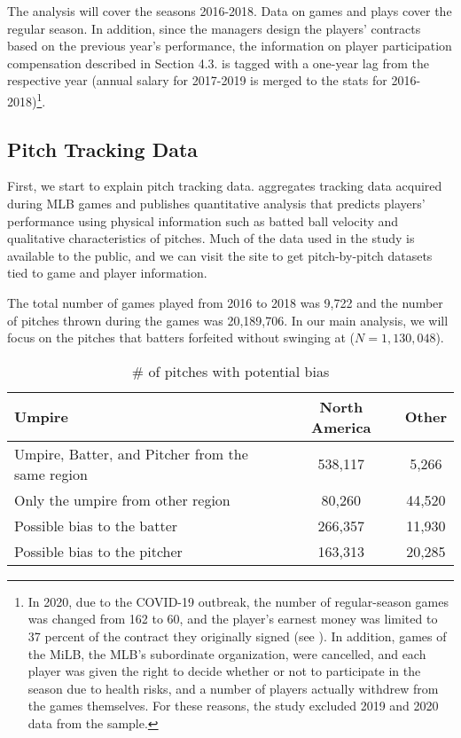 \documentclass[dvipdfmx, 12pt]{jsarticle}
\begin{document}
The analysis will cover the seasons 2016-2018. Data on games and plays cover the regular season. In addition, since the managers design the players' contracts based on the previous year's performance, the information on player participation compensation described in Section 4.3. is tagged with a one-year lag from the respective year (annual salary for 2017-2019 is merged to the stats for 2016-2018)\footnote{In 2020, due to the COVID-19 outbreak, the number of regular-season games was changed from 162 to 60, and the player's earnest money was limited to 37 percent of the contract they originally signed (see \citet{salary_cut}). In addition, games of the MiLB, the MLB's subordinate organization, were cancelled, and each player was given the right to decide whether or not to participate in the season due to health risks, and a number of players actually withdrew from the games themselves.
For these reasons, the study excluded 2019 and 2020 data from the sample.}.

\subsection{Pitch Tracking Data}

First, we start to explain pitch tracking data.
\citet{baseballsavant} aggregates tracking data acquired during MLB games and publishes quantitative analysis that predicts players' performance using physical information such as batted ball velocity and qualitative characteristics of pitches. Much of the data used in the study is available to the public, and we can visit the site to get pitch-by-pitch datasets tied to game and player information.

The total number of games played from 2016 to 2018 was 9,722 and the number of pitches thrown during the games was 20,189,706. In our main analysis, we will focus on the pitches that batters forfeited without swinging at ($N = 1,130,048$).

\begin{table}[ht]
  \caption{\# of pitches with potential bias}
  \centering
  \label{pitches}
  \begin{tabular}{lcc}\hline
    Umpire & North America & Other\\ \hline
    Umpire, Batter, and Pitcher from the same region & 538,117 & 5,266\\
    Only the umpire from other region & 80,260 & 44,520 \\
    Possible bias to the batter & 266,357 & 11,930 \\
    Possible bias to the pitcher & 163,313 & 20,285 \\ \hline
  \end{tabular}
\end{table}
\end{document}
